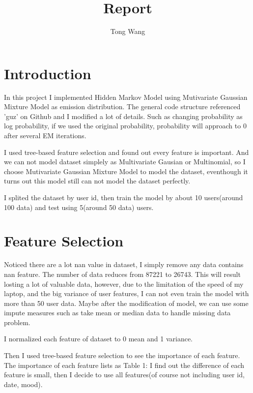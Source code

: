 \documentclass{article}
\begin{document}
\title{Report}
\author{Tong Wang}
\maketitle

\section{Introduction}
In this project I implemented Hidden Markov Model using Mutivariate Gaussian Mixture Model as emission distribution. The general code structure referenced 'guz' on Github and I modified a lot of details. Such as changing probability as log probability, if we used the original probability, probability will approach to 0 after several EM iterations.

I used tree-based feature selection and found out every feature is important. And we can not model dataset simplely as Multivariate Gausian or Multinomial, so I choose Mutivariate Gaussian Mixture Model to model the dataset, eventhough it turns out this model still can not model the dataset perfectly.  

I splited the dataset by user id, then train the model by about 10 users(around 100  data) and test using 5(around 50 data) users.  

\section{Feature Selection}

Noticed there are a lot nan value in dataset, I simply remove any data contains nan feature. The number of data reduces from 87221 to 26743. This will result losting a lot of valuable data, however, due to the limitation of the speed of my laptop, and the big variance of user features, I can not even train the model with more than 50 user data. Maybe after the modification of model, we can use some impute measures such as take mean or median data to handle missing data problem. 

I normalized each feature of dataset to 0 mean and 1 variance.

Then I used tree-based feature selection to see the importance of each feature. The importance of each feature lists as Table 1: I find out the difference of each feature is small, then I decide to use all features(of course not including user id, date, mood).
\begin{table}
\begin{center}
\caption{Importance of each feature}
\end{center}
\end{table}
\end{document}
